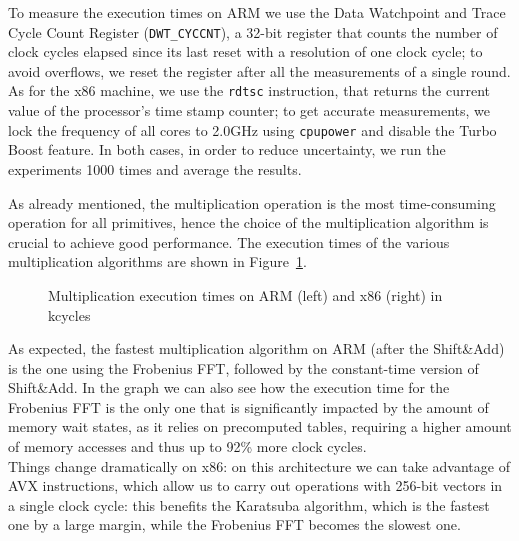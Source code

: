 \documentclass[11pt,a4paper,twocolumn]{article}
\theoremstyle{definition}
\begin{document}
To measure the execution times on ARM we use the Data Watchpoint and Trace Cycle Count Register (\texttt{DWT\_CYCCNT}),
a 32-bit register that counts the number of clock cycles elapsed since its last reset with a resolution
of one clock cycle; to avoid overflows, we reset the register after all the measurements of a single round.
As for the x86 machine, we use the \texttt{rdtsc} instruction, that returns the current value of the processor's time stamp counter;
to get accurate measurements, we lock the frequency of all cores to 2.0GHz using \texttt{cpupower} and disable
the Turbo Boost feature.
In both cases, in order to reduce uncertainty, we run the experiments 1000 times and average the results.

As already mentioned, the multiplication operation is the most time-consuming operation for all primitives, hence the choice of
the multiplication algorithm is crucial to achieve good performance. The execution times of the various multiplication algorithms
are shown in Figure~\ref{fig:multTiming}.

\begin{figure}
    \hspace{-10pt}
    \subfloat{
        \ARMtimingplotmult{\armMultTiming}
    }
    \subfloat{
        \xtimingplotmult{\xMultTiming}
    }
    \centering
    \newline
    \timingLegend
    \caption{Multiplication execution times on ARM (left) and x86 (right) in kcycles}
    \label{fig:multTiming}
\end{figure}

As expected, the fastest multiplication algorithm on ARM (after the Shift\&Add) is the one using the Frobenius FFT, followed by the
constant-time version of Shift\&Add. In the graph we can also see how the execution time for the Frobenius FFT is the only one
that is significantly impacted by the amount of memory wait states, as it relies on precomputed tables, requiring a higher amount 
of memory accesses and thus up to 92\% more clock cycles.\\
Things change dramatically on x86: on this architecture we can take advantage of AVX instructions, which allow us to carry out
operations with 256-bit vectors in a single clock cycle: this benefits the Karatsuba algorithm, which is the fastest one by a large margin,
while the Frobenius FFT becomes the slowest one.
\end{document}
